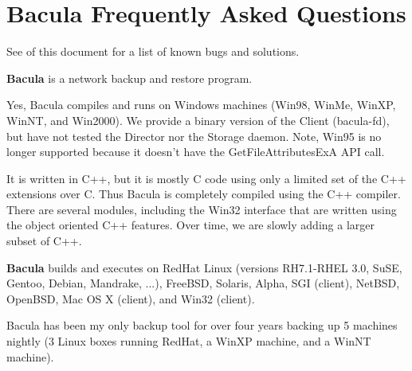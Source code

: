 
\section*{Bacula Frequently Asked Questions}
\label{_ChapterStart48}

See 
 of this document for a list
of known bugs and solutions.

\begin{description}
\label{what}

\item [What is {\bf Bacula}? ]
   {\bf Bacula} is a network backup and restore program. 

\item [Does Bacula support Windows?]
   Yes, Bacula compiles and runs on Windows machines  (Win98, WinMe, WinXP,
   WinNT, and Win2000).  We provide a binary version of the Client (bacula-fd),
   but have  not tested the Director nor the Storage daemon. Note, Win95  is no
   longer supported because it doesn't have the  GetFileAttributesExA API call.  

\label{lang}
\item [What language is Bacula written in?]
   It is written in C++, but it is mostly C  code using only a limited set of the
   C++ extensions  over C.  Thus Bacula is completely  compiled using the C++
   compiler. There are several modules,  including the Win32 interface that are
   written using the  object oriented C++ features. Over time, we are slowly
   adding a larger  subset of C++.  

\label{run}
\item [On what machines does Bacula run? ]
   {\bf Bacula} builds and executes on RedHat Linux (versions  RH7.1-RHEL 3.0,
   SuSE, Gentoo, Debian, Mandrake, ...), FreeBSD,  Solaris, Alpha, SGI (client),
   NetBSD, OpenBSD, Mac OS X (client),  and Win32 (client).  

   Bacula has been my only backup tool for over  four years backing up 5 machines
   nightly (3 Linux boxes  running RedHat, a WinXP machine, and a WinNT machine).
 


\end{description}

